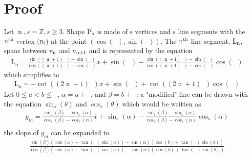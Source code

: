 \documentclass[11pt]{article}
\DeclareMathOperator{\custd}{\mathrm{d}_s}
\DeclareMathOperator{\custi}{\mathrm{n}}
\DeclareMathOperator{\period}{\frac{2\pi}{s}}
\DeclareMathOperator{\hp}{\frac{\pi}{s}}
\DeclareMathOperator{\iperiod}{\custi\frac{2\pi}{s}}
\begin{document}
\section{Proof}
Let \(\custi,s=\mathbb{Z},s\geq3\). Shape \(\rm P_s\) is made of s vertices and s line segments with the \(\rm n^{th}\) vertex (\(\rm n_i\)) at the point \((\cos(\iperiod), \sin(\iperiod))\). The \(\rm n^{th}\) line segment, \(\rm L_n\), spans between \(\rm v_n\) and \(\rm v_{n+1}\) and is represented by the equation
\begin{gather*}
\mathrm{L_n}=\frac{\sin((\custi+1)\period)-\sin(\iperiod)}{\cos((\custi+1)\period)-\cos(\iperiod)}x+\sin(\iperiod)-\frac{\sin((\custi+1)\period)-\sin(\iperiod)}{\cos((\custi+1)\period)-\cos(\iperiod)}\cos(\iperiod)
\end{gather*}
which simplifies to
\begin{gather*}
\mathrm{L_n}=-\cot((2\custi+1)\hp)x+\sin(\iperiod)+\cot((2\custi+1)\hp)\cos(\iperiod)
\end{gather*}
Let \(0\leq a<b\leq\period\), \(\alpha=a+\iperiod\), and \(\beta=b+\iperiod\): a "modified" line can be drawn with the equation \(\sin_s(\theta)\) and \(\cos_s(\theta)\) which would be written as
\begin{gather*}
y_m=\frac{\sin_s(\beta)-\sin_s(\alpha)}{\cos_s(\beta)-\cos_s(\alpha)}x+\sin_s(\alpha)-\frac{\sin_s(\beta)-\sin_s(\alpha)}{\cos_s(\beta)-\cos_s(\alpha)}\cos_s(\alpha)\\
\end{gather*}
the slope of \(y_m\) can be expanded to
\begin{gather*}
\frac{\sin(\beta)(\cos(a)+\tan(\hp)\sin(a))-\sin(\alpha)(\cos(b)+\tan(\hp)\sin(b))}{\cos(\beta)(\cos(a)+\tan(\hp)\sin(a))-\cos(\alpha)(\cos(b)+\tan(\hp)\sin(b))}
\end{gather*}
\end{document}
